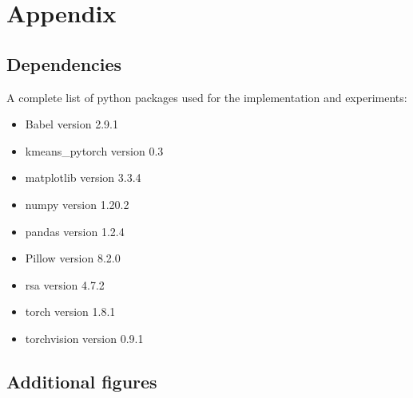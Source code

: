 \appendix
\chapter{Appendix}

\section{Dependencies}
\label{sec:dependencies}

A complete list of python packages used for the implementation and experiments:

\begin{itemize}
    \item Babel version 2.9.1
    \item kmeans\_pytorch version 0.3
    \item matplotlib version 3.3.4
    \item numpy version 1.20.2
    \item pandas version 1.2.4
    \item Pillow version 8.2.0
    \item rsa version 4.7.2
    \item torch version 1.8.1
    \item torchvision version 0.9.1
\end{itemize}

\section{Additional figures}
\label{sec:appendix:additional-figures}
